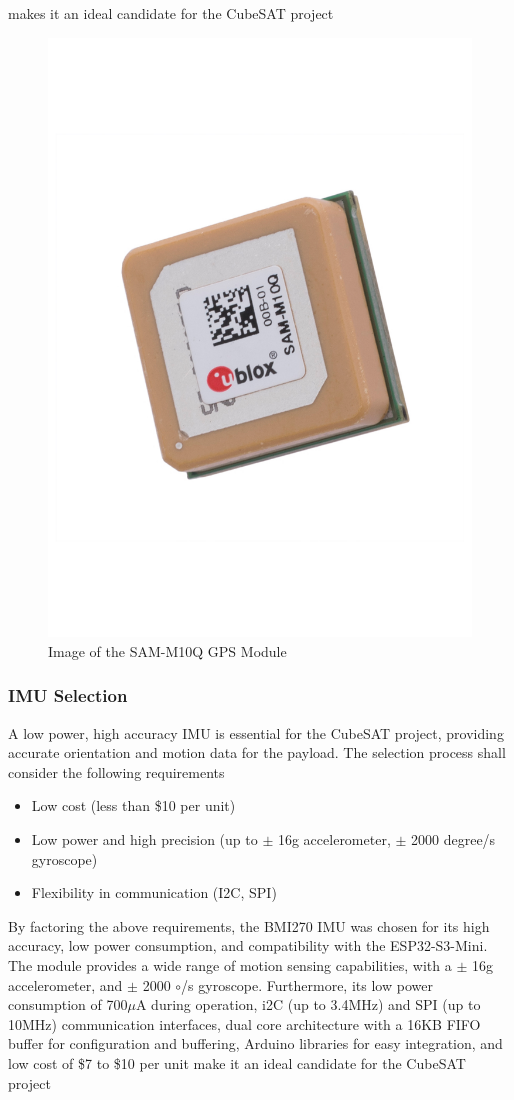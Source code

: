 \documentclass{report}
\begin{document}
                    makes it an ideal candidate for the CubeSAT project \cite{sammdatasheet}
                    \begin{figure}[H]
                        \centering
                        \includegraphics[width=0.3\linewidth, angle=270]{figures/GPS_IMG.pdf}
                        \caption{Image of the SAM-M10Q GPS Module}
                        \label{fig:gps_img}
                    \end{figure}
                \subsubsection{IMU Selection}
                    A low power, high accuracy IMU is essential for the CubeSAT project, providing
                    accurate orientation and motion data for the payload. The selection process shall
                    consider the following requirements
                    \begin{itemize}
                        \item Low cost (less than \$10 per unit)
                        \item Low power and high precision (up to $\pm$ 16g accelerometer, $\pm$ 2000 degree/s gyroscope)
                        \item Flexibility in communication (I2C, SPI)
                    \end{itemize}
                    By factoring the above requirements, the BMI270 IMU was chosen for its high accuracy,
                    low power consumption, and compatibility with the ESP32-S3-Mini. The module provides
                    a wide range of motion sensing capabilities, with a $\pm$ 16g accelerometer, and $\pm$ 2000 $\circ$/s gyroscope.
                    Furthermore, its low power consumption of 700$\mu$A during operation, i2C (up to 3.4MHz) and SPI (up to 10MHz) communication
                    interfaces, dual core architecture with a 16KB FIFO buffer for configuration and buffering,
                    Arduino libraries for easy integration, and low cost of \$7 to \$10 per unit make it an ideal candidate for the CubeSAT project \cite{bmidatasheet}
\end{document}
